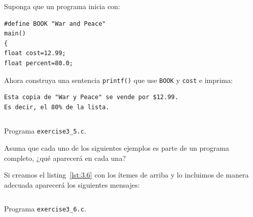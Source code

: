 \documentclass[spanish,addpoints,answers,a4paper]{exam}
\begin{document}
\begin{questions}
\question Suponga que un programa inicia con:

\begin{verbatim}
#define BOOK "War and Peace"
main()
{
float cost=12.99;
float percent=80.0;
\end{verbatim}

Ahora construya una sentencia \texttt{printf()} que use \texttt{BOOK} y \texttt{cost} e imprima:

\begin{verbatim}
Esta copia de "War y Peace" se vende por $12.99.
Es decir, el 80% de la lista.
\end{verbatim}

\begin{solution}
\begin{listing}[H]
	\footnotesize
	\inputminted{c}{exercise3_5.c}
	\caption{Programa \texttt{exercise3\_5.c}.}
	\label{lst:3.5}
\end{listing}
\end{solution}

\question Asuma que cada uno de los siguientes ejemplos es parte de un programa completo, ¿qué aparecerá en cada una?


\begin{solution}
Si creamos el listing~\ref{lst:3.6} con los ítemes de arriba y lo incluimos de manera adecuada aparecerá los siguientes mensajes:

\begin{listing}[H]
	\footnotesize
	\inputminted{c}{exercise3_6.c}
	\caption{Programa \texttt{exercise3\_6.c}.}
	\label{lst:3.6}
\end{listing}

\end{solution}
\end{questions}
\end{document}
